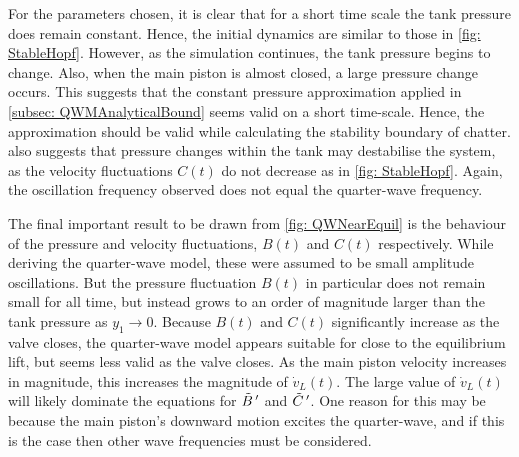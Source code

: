 For the parameters chosen, it is clear that for a short time scale the tank pressure does remain constant. Hence, the initial dynamics are similar to those in \cref{fig: StableHopf}. However, as the simulation continues, the tank pressure begins to change. Also, when the main piston is almost closed, a large pressure change occurs. This suggests that the constant pressure approximation applied in \cref{subsec: QWMAnalyticalBound} seems valid on a short time-scale. Hence, the approximation should be valid while calculating the stability boundary of chatter.  also suggests that pressure changes within the tank may destabilise the system, as the velocity fluctuations $C(t)$ do not decrease as in \cref{fig: StableHopf}. Again, the oscillation frequency observed does not equal the quarter-wave frequency.

The final important result to be drawn from \cref{fig: QWNearEquil} is the behaviour of the pressure and velocity fluctuations, $B(t)$ and $C(t)$ respectively. While deriving the quarter-wave model, these were assumed to be small amplitude oscillations. But the pressure fluctuation $B(t)$ in particular does not remain small for all time, but instead grows to an order of magnitude larger than the tank pressure as $y_1 \rightarrow 0$.
Because $B(t)$ and $C(t)$ significantly increase as the valve closes, the quarter-wave model appears suitable for close to the equilibrium lift, but seems less valid as the valve closes. As the main piston velocity increases in magnitude, this increases the magnitude of $\dot{v}_L(t)$. The large value of $\dot{v}_L(t)$ will likely dominate the equations for $\tilde{B} \,{'}$ and $\tilde{C} \,{'}$. One reason for this may be because the main piston's downward motion excites the quarter-wave, and if this is the case then other wave frequencies must be considered.